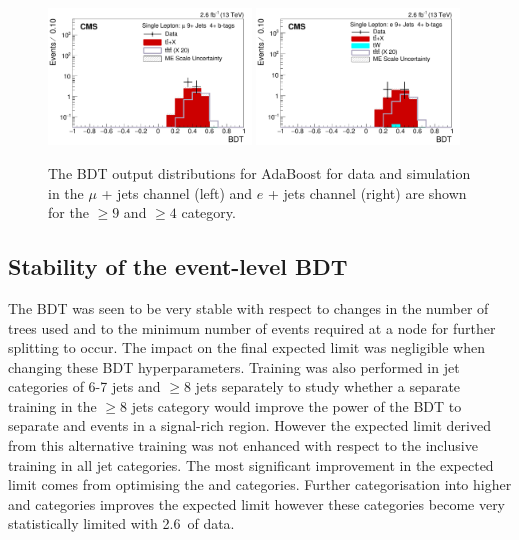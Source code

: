 \begin{figure}[ht!]
    \includegraphics[width=0.48\textwidth]{images/Run2/BDT_Mu29Aug400trees_5MinNodeSize_20nCuts_3MaxDepth_5adaboostbeta_adaBoost_alphaSTune_noMinEvents9nJets4nMtags_StackLogY.pdf}
    \includegraphics[width=0.48\textwidth]{images/Run2/BDT_El29Aug400trees_5MinNodeSize_20nCuts_3MaxDepth_5adaboostbeta_adaBoost_alphaSTune_noMinEvents9nJets4nMtags_StackLogY.pdf}    
    \caption{The BDT output distributions for AdaBoost for data and simulation in the $\mu$ + jets channel (left) and $e$ + jets channel (right) are shown for the $\geq9$ \njets and $\geq4$ \nMtags category.}
    \label{fig:BDT_Mu29Aug400trees_5MinNodeSize_20nCuts_3MaxDepth_5adaboostbeta_adaBoost_alphaSTune_noMinEvents94}
\end{figure}

\subsection{Stability of the event-level BDT}

The BDT was seen to be very stable with respect to changes in the number of trees used and to the minimum number of events required at a node for further splitting to occur. The impact on the final expected limit was negligible when changing these BDT hyperparameters. Training was also performed in jet categories of 6-7 jets and $\geq$8 jets separately to study whether a separate training in the $\geq8$ jets category would improve the power of the BDT to separate \ttbar and \tttt events in a signal-rich region. However the expected limit derived from this alternative training was not enhanced with respect to the inclusive training in all jet categories. The most significant improvement in the expected limit comes from optimising the \njets and \nMtags categories. Further categorisation into higher \njets and \nMtags categories improves the expected limit however these categories become very statistically limited with 2.6~\fbinv of data.

